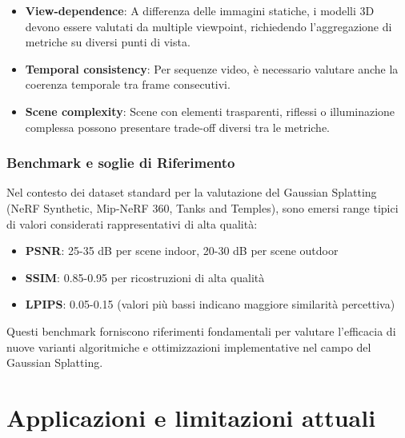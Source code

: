 \begin{itemize}
	\item \textbf{View-dependence}: A differenza delle immagini statiche, i modelli 3D devono essere valutati da multiple viewpoint, richiedendo l'aggregazione di metriche su diversi punti di vista.
	\item \textbf{Temporal consistency}: Per sequenze video, è necessario valutare anche la coerenza temporale tra frame consecutivi.
	\item \textbf{Scene complexity}: Scene con elementi trasparenti, riflessi o illuminazione complessa possono presentare trade-off diversi tra le metriche.
\end{itemize}

\subsubsection{Benchmark e soglie di Riferimento}

Nel contesto dei dataset standard per la valutazione del Gaussian Splatting (NeRF Synthetic, Mip-NeRF 360, Tanks and Temples), sono emersi range tipici di valori considerati rappresentativi di alta qualità:

\begin{itemize}
	\item \textbf{PSNR}: 25-35 dB per scene indoor, 20-30 dB per scene outdoor
	\item \textbf{SSIM}: 0.85-0.95 per ricostruzioni di alta qualità
	\item \textbf{LPIPS}: 0.05-0.15 (valori più bassi indicano maggiore similarità percettiva)
\end{itemize}

Questi benchmark forniscono riferimenti fondamentali per valutare l'efficacia di nuove varianti algoritmiche e ottimizzazioni implementative nel campo del Gaussian Splatting.

\section{Applicazioni e limitazioni attuali} 
